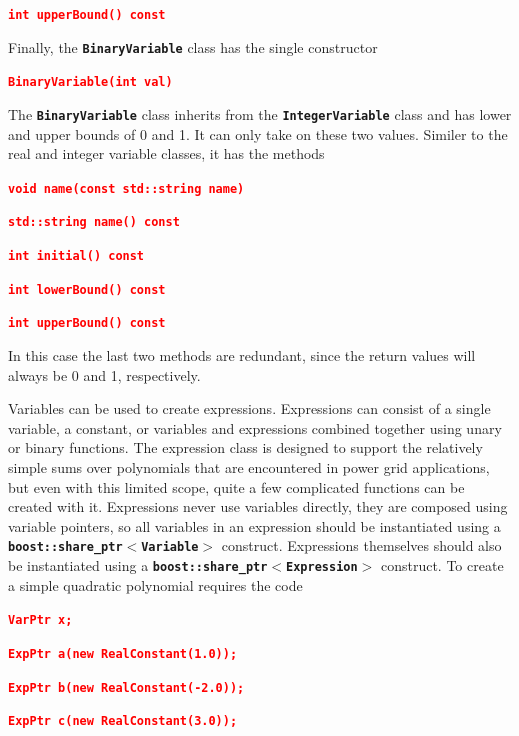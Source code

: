 \documentclass[12pt]{report} %
\begin{document}
\textcolor{red}{\texttt{\textbf{int upperBound() const}}}

Finally, the \texttt{\textbf{BinaryVariable}} class has the single constructor

\textcolor{red}{\texttt{\textbf{BinaryVariable(int val)}}}

The \texttt{\textbf{BinaryVariable}} class inherits from the \texttt{\textbf{IntegerVariable}} class and has lower and upper bounds of 0 and 1. It can only take on these two values. Similer to the real and integer variable classes, it has the methods

\textcolor{red}{\texttt{\textbf{void name(const std::string name)}}}

\textcolor{red}{\texttt{\textbf{std::string name() const}}}

\textcolor{red}{\texttt{\textbf{int initial() const}}}

\textcolor{red}{\texttt{\textbf{int lowerBound() const}}}

\textcolor{red}{\texttt{\textbf{int upperBound() const}}}

In this case the last two methods are redundant, since the return values will always be 0 and 1, respectively.

Variables can be used to create expressions. Expressions can consist of a single variable, a constant, or variables and expressions combined together using unary or binary functions. The expression class is designed to support the relatively simple sums over polynomials that are encountered in power grid applications, but even with this limited scope, quite a few complicated functions can be created with it. Expressions never use variables directly, they are composed using variable pointers, so all variables in an expression should be instantiated using a \texttt{\textbf{boost::share\_ptr$\boldsymbol{\mathrm{<}}$Variable$\boldsymbol{\mathrm{>}}$}} construct. Expressions themselves should also be instantiated using a \texttt{\textbf{boost::share\_ptr$\boldsymbol{\mathrm{<}}$Expression$\boldsymbol{\mathrm{>}}$}} construct. To create a simple quadratic polynomial requires the code

\textcolor{red}{\texttt{\textbf{VarPtr x;}}}

\textcolor{red}{\texttt{\textbf{ExpPtr a(new RealConstant(1.0));}}}

\textcolor{red}{\texttt{\textbf{ExpPtr b(new RealConstant(-2.0));}}}

\textcolor{red}{\texttt{\textbf{ExpPtr c(new RealConstant(3.0));}}}
\end{document}
